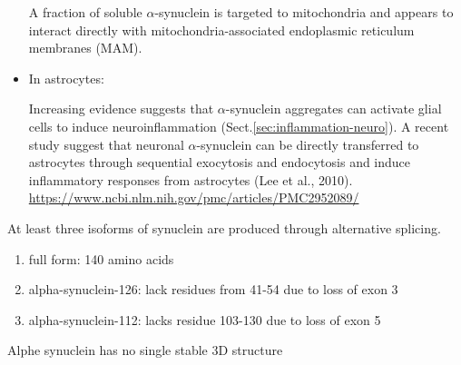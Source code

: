 \begin{itemize}
A fraction of soluble $\alpha$-synuclein is targeted to mitochondria and appears to
interact directly with mitochondria-associated endoplasmic reticulum membranes
(MAM).
 
 
   \item In astrocytes:
   
Increasing evidence suggests that $\alpha$-synuclein aggregates can activate
glial cells to induce neuroinflammation (Sect.\ref{sec:inflammation-neuro}). 
A recent study suggest that neuronal $\alpha$-synuclein can be directly transferred to
astrocytes through sequential exocytosis and endocytosis and induce inflammatory
responses from astrocytes (Lee et al., 2010).
\url{https://www.ncbi.nlm.nih.gov/pmc/articles/PMC2952089/}

\end{itemize}


At least three isoforms of synuclein are produced through alternative splicing.
\begin{enumerate}
  \item full form: 140 amino acids
  \item alpha-synuclein-126: lack residues from 41-54 due to loss of exon 3
  \item alpha-synuclein-112: lacks residue 103-130 due to loss of exon 5
\end{enumerate}
Alphe synuclein has no single stable 3D structure

